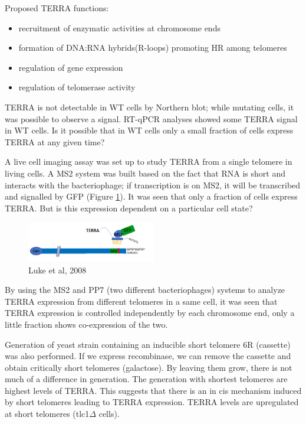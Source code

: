 Proposed TERRA functions:

\begin{itemize}
\tightlist
\item
  recruitment of enzymatic activities at chromosome ends
\item
  formation of DNA:RNA hybrids(R-loops) promoting HR among telomeres
\item
  regulation of gene expression
\item
  regulation of telomerase activity
\end{itemize}

TERRA is not detectable in WT cells by Northern blot; while mutating
cells, it was possible to observe a signal. RT-qPCR analyses showed some
TERRA signal in WT cells. Is it possible that in WT cells only a small
fraction of cells express TERRA at any given time?

A live cell imaging assay was set up to study TERRA from a single
telomere in living cells. A MS2 system was built based on the fact that RNA is short
and interacts with the bacteriophage; if transcription is on MS2, it will be
transcribed and signalled by GFP (Figure \ref{fig:ms2}). It was seen that only a fraction of
cells express TERRA. But is this expression dependent on a particular
cell state?

\begin{figure}
\centering
\includegraphics[width=0.5\textwidth]{../_resources/Screen_Shot_2022-12-16_at_21-50-07.png}
\caption{Luke et al, 2008}
\label{fig:ms2}
\end{figure}

By using the MS2 and PP7 (two different bacteriophages) systems to analyze
TERRA expression from different telomeres in a same cell, it was seen that TERRA
expression is controlled independently by each chromosome end, only a
little fraction shows co-expression of the two.

Generation of yeast strain containing an inducible short telomere 6R
(cassette) was also performed. If we express recombinase, we can remove the cassette and
obtain critically short telomeres (galactose). By leaving them grow,
there is not much of a difference in generation. The generation with
shortest telomeres are highest levels of TERRA. This suggests that there
is an in cis mechanism induced by short telomeres leading to TERRA
expression. TERRA levels are upregulated at short telomeres
(tlc1\(\Delta\) cells).

